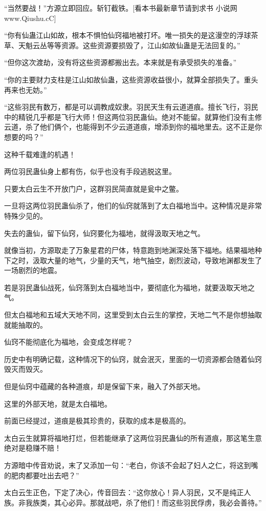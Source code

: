 \begin{this_body}
“当然要战！”方源立即回应。斩钉截铁。[看本书最新章节请到求书 小说网www.Qiushu.cC]

“你有仙蛊江山如故，根本不惧怕仙窍福地被打坏。唯一损失的是这漫空的浮球茶草、天魁云丛等等资源。这些资源要损毁了，江山如故仙蛊是无法回复的。”

“但你这次渡劫，没有将这些资源都搬出去。本来就是有承受损失的准备。”

“你的主要财力支柱是江山如故仙蛊，这些资源收益很小，就算全部损失了。重头再来也无妨。”

“这些羽民有数万，都是可以调教成奴隶。羽民天生有云道道痕。擅长飞行，羽民中的精锐几乎都是飞行大师！但这两位羽民蛊仙。绝对不能留。就算他们没有主修云道，杀了他们俩个，也能得到不少云道道痕，增添到你的福地里去。这不正是你想要的吗？”

这种千载难逢的机遇！

两位羽民蛊仙身上都有伤，似乎也没有手段逃脱这里。

只要太白云生不开放门户，这群羽民简直就是瓮中之鳖。

一旦将这两位羽民蛊仙杀了，他们的仙窍就落到了太白福地当中。这种情况是非常特殊少见的。

失去的蛊仙，留下仙窍，仙窍要化为福地，就得汲取天地之气。

就像当初，方源取走了万象星君的尸体，特意跑到地渊深处落下福地。结果福地种下之时，汲取大量的地气，少量的天气，地气抽空，剧烈波动，导致地渊都发生了一场剧烈的地震。

若是羽民蛊仙战死，仙窍落到太白福地当中，要彻底化为福地，就要汲取天地之气。

但太白福地和五域大天地不同，这里受到太白云生的掌控，天地二气不是你想抽取就能抽取的。

仙窍不能彻底化为福地，会变成怎样呢？

历史中有明确记载，这种情况下的仙窍，就会泯灭，里面的一切资源都会随着仙窍毁灭而毁灭。

但是仙窍中蕴藏的各种道痕，却是保留下来，融入了外部天地。

这里的外部天地，就是太白福地。

前面已经提过，道痕是极其珍贵的，获取的成本是极高的。

太白云生就算将福地打烂，但若能继承了这两位羽民蛊仙的所有道痕，那这笔生意绝对是稳赚不赔！

方源暗中传音劝说，末了又添加一句：“老白，你该不会起了妇人之仁，将这到嘴的肥肉都要吐出去吧？”

太白云生正色，下定了决心，传音回去：“这你放心！异人羽民，又不是纯正人族。非我族类，其心必异。那就战吧，杀了他们！而这些羽民俘虏，我必会善待。”


\end{this_body}
